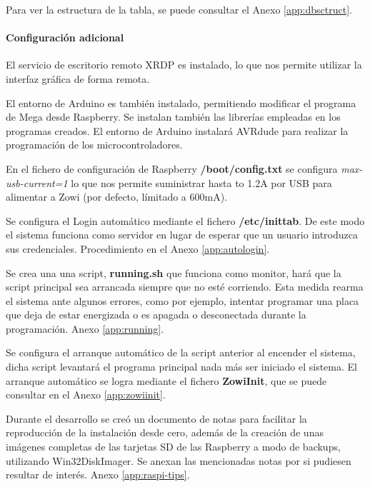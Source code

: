 Para ver la estructura de la tabla, se puede consultar el Anexo \ref{app:dbsctruct}.

\paragraph{Configuración adicional}
El servicio de escritorio remoto XRDP es instalado, lo que nos permite utilizar la interfaz gráfica de forma remota.

El entorno de Arduino es también instalado, permitiendo modificar el programa de Mega desde Raspberry. Se instalan también las librerías empleadas en los programas creados. El entorno de Arduino instalará AVRdude para realizar la programación de los microcontroladores.

En el fichero de configuración de Raspberry \textbf{/boot/config.txt} se configura \textit{max-usb-current=1} lo que nos permite suministrar hasta to 1.2A por USB para alimentar a Zowi (por defecto, límitado a 600mA).

Se configura el Login automático mediante el fichero \textbf{/etc/inittab}. De este modo el sistema funciona como servidor en lugar de esperar que un usuario introduzca sus credenciales. Procedimiento en el Anexo \ref{app:autologin}.

Se crea una una script, \textbf{running.sh} que funciona como monitor, hará que la script principal sea arrancada siempre que no esté corriendo. Esta medida rearma el sistema ante algunos errores, como por ejemplo, intentar programar una placa que deja de estar energizada o es apagada o desconectada durante la programación. Anexo \ref{app:running}.

Se configura el arranque automático de la script anterior al encender el sistema, dicha script levantará el programa principal nada más ser iniciado el sistema. El arranque automático se logra mediante el fichero \textbf{ZowiInit}, que se puede consultar en el Anexo \ref{app:zowiinit}.

Durante el desarrollo se creó un documento de notas para facilitar la reproducción de la instalación desde cero, además de la creación de unas imágenes completas de las tarjetas SD de las Raspberry a modo de backups, utilizando Win32DiskImager. Se anexan las mencionadas notas por si pudiesen resultar de interés. Anexo \ref{app:raspi-tips}.


